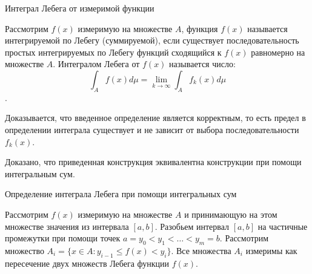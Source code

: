\documentclass[14pt,a4paper]{extarticle}
\theoremstyle{definition}
\theoremstyle{remark}
\renewcommand{\[}{\begin{dmath*}[compact]}
\renewcommand{\]}{\end{dmath*}}
\begin{document}
Интеграл Лебега от измеримой функции

Рассмотрим $f(x)$ измеримую на множестве $A$, функция $f(x)$ называется интегрируемой по Лебегу (суммируемой), если существует последовательность простых интегрируемых по Лебегу функций сходящийся к $f(x)$ равномерно на множестве $A$. Интегралом Лебега от $f(x)$ называется число:
\[\int_A f(x) d\mu = \lim_{k \to \infty} \int_A f_k(x) d\mu\].

Доказывается, что введенное определение является корректным, то есть предел в определении интеграла существует и не зависит от выбора последовательности $f_k(x)$.

Доказано, что приведенная конструкция эквивалентна конструкции при помощи интегральным сум.

Определение интеграла Лебега при помощи интегральных сум

Рассмотрим $f(x)$ измеримую на множестве $A$ и принимающую на этом множестве значения из интервала $[a,b]$. Разобьем интервал $[a,b]$ на частичные промежутки при помощи точек $a=y_0 < y_1 < \dots < y_m = b$. Рассмотрим множество $A_i = \{x \in A: y_{i-1} \leq f(x) < y_i\}$. Все множества $A_i$ измеримы как пересечение двух множеств Лебега функции $f(x)$.

\end{document}
